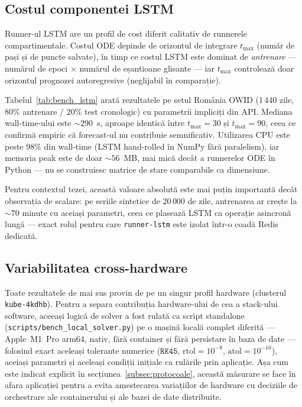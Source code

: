 \subsection{Costul componentei LSTM}
\label{subsec:bench_lstm}

Runner-ul LSTM are un profil de cost diferit calitativ de runnerele
compartimentale. Costul ODE depinde de orizontul de integrare $t_{\max}$
(număr de pași și de puncte salvate), în timp ce costul LSTM este dominat de
\emph{antrenare} --- numărul de epoci $\times$ numărul de eșantioane glisante
--- iar $t_{\max}$ controlează doar orizontul prognozei autoregresive
(neglijabil în comparație).

Tabelul~\ref{tab:bench_lstm} arată rezultatele pe setul România OWID
(1\,440 zile, $80\%$ antrenare $/$ $20\%$ test cronologic) cu parametrii
impliciți din API. Mediana wall-time-ului este $\sim$$290$~s, aproape identică
între $t_{\max}=30$ și $t_{\max}=90$, ceea ce confirmă empiric că forecast-ul
nu contribuie semnificativ. Utilizarea CPU este peste $98\%$ din wall-time
(LSTM hand-rolled în NumPy fără paralelism), iar memoria peak este de doar
$\sim$$56$~MB, mai mică decât a runnerelor ODE în Python --- nu se construiesc
matrice de stare comparabile ca dimensiune.



Pentru contextul tezei, această valoare absolută este mai puțin importantă
decât observația de scalare: pe seriile sintetice de $20\,000$ de zile,
antrenarea ar crește la $\sim$$70$ minute cu aceiași parametri, ceea ce
plasează LSTM ca operație asincronă lungă --- exact rolul pentru care
\texttt{runner-lstm} este izolat într-o coadă Redis dedicată.

\subsection{Variabilitatea cross-hardware}
\label{subsec:hardware_variability}

Toate rezultatele de mai sus provin de pe un singur profil hardware
(clusterul \texttt{kube-4kdhb}). Pentru a separa contribuția hardware-ului
de cea a stack-ului software, aceeași logică de solver a fost rulată ca
script standalone (\texttt{scripts/bench\_local\_solver.py}) pe o mașină
locală complet diferită --- Apple~M1~Pro arm64, nativ, fără container și
fără persistare în baza de date --- folosind exact aceleași tolerante numerice
($\texttt{RK45}$, $\mathrm{rtol}=10^{-8}$, $\mathrm{atol}=10^{-10}$), aceiași
parametri și aceleași condiții inițiale ca rulările prin aplicație. Așa cum
este indicat explicit în secțiunea~\ref{subsec:protocoale}, această
măsurare se face în afara aplicației pentru a evita amestecarea variațiilor
de hardware cu deciziile de orchestrare ale containerului și ale bazei de
date distribuite.

